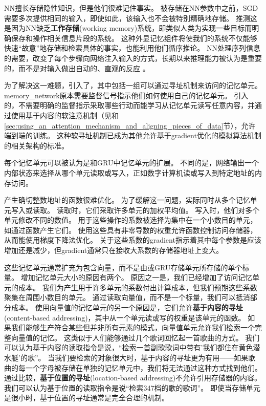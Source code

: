\gls{NN}擅长存储隐性知识，但是他们很难记住事实。
被存储在\gls{NN}参数中之前，\gls{SGD}需要多次提供相同的输入，即使如此，该输入也不会被特别精确地存储。
\citep{Graves-et-al-arxiv2014}推测这是因为\gls{NN}缺乏\textbf{工作存储}(working memory)系统，即类似人类为实现一些目标而明确保存和操作相关信息片段的系统。
这种外显记忆组件将使我们的系统不仅能够快速``故意''地存储和检索具体的事实，也能利用他们循序推论。
\gls{NN}处理序列信息的需要，改变了每个步骤向网络注入输入的方式，长期以来推理能力被认为是重要的，而不是对输入做出自动的、直观的反应\citep{hinton1990mapping} 。


为了解决这一难题，\citep{Weston2014}引入了，其中包括一组可以通过寻址机制来访问的记忆单元。
\gls{memory_network}原本需要监督信号指示他们如何使用自己的记忆单元。
\citep{Graves-et-al-arxiv2014}引入的，不需要明确的监督指示采取哪些行动而能学习从记忆单元读写任意内容，并通过使用基于内容的软注意机制（见\citep{Bahdanau-et-al-ICLR2015-small}和\ref{sec:using_an_attention_mechanism_and_aligning_pieces_of_data}节），允许端到端的训练。
这种软寻址机制已成为其他允许基于\gls{gradient}优化的模拟算法机制的相关架构的标准\citep{Sukhbaatar2015,Joulin+Mikolov-2015,Kumar-et-al-2015,Vinyals2015,Grefenstette-et-al-NIPS2015}。

每个记忆单元可以被认为是和GRU中记忆单元的扩展。
不同的是，网络输出一个内部状态来选择从哪个单元读取或写入，正如数字计算机读或写入到特定地址的内存访问。


产生确切整数地址的函数很难优化。
为了缓解这一问题，实际同时从多个记忆单元写入或读取。
读取时，它们采取许多单元的加权平均值。
写入时，他们对多个单元修改不同的数值。
用于这些操作的系数被选择为集中在一个小数目的单元，如通过函数产生它们。
使用这些具有非零导数的权重允许函数控制访问存储器，从而能使用梯度下降法优化。
关于这些系数的\gls{gradient}指示着其中每个参数是应该增加还是减少，但\gls{gradient}通常只在接收大系数的存储器地址上变大。

这些记忆单元通常扩充为包含向量，而不是由或GRU存储单元所存储的单个标量。
增加记忆单元大小的原因有两个。
原因之一是，我们已经增加了访问记忆单元的成本。
我们为产生用于许多单元的系数付出计算成本，但我们预期这些系数聚集在周围小数目的单元。
通过读取向量值，而不是一个标量，我们可以抵消部分成本。 
使用向量值的记忆单元的另一个原因是，它们允许\textbf{基于内容的寻址}(content-based addressing)，其中从一个单元读或写的权重是该单元的函数。
如果我们能够生产符合某些但并非所有元素的模式，向量值单元允许我们检索一个完整向量值的记忆。
这类似于人们能够通过几个歌词回忆起一首歌曲的方式。
我们可以认为基于内容的读取指令是说，``检索一首副歌歌词中带有'我们都住在黄色潜水艇'的歌''。
当我们要检索的对象很大时，基于内容的寻址更为有用——如果歌曲的每一个字母被存储在单独的记忆单元中，我们将无法通过这种方式找到他们。
通过比较，\textbf{基于位置的寻址}(location-based addressing)不允许引用存储器的内容。
我们可以认为基于位置的读取指令是说``检索347档的歌的歌词''。
即使当存储单元是很小时，基于位置的寻址通常是完全合理的机制。

